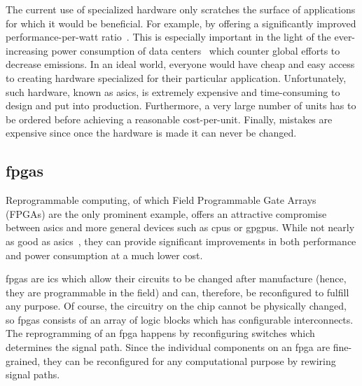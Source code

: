 The current use of specialized hardware only scratches the surface of
applications for which it would be beneficial. For example, by offering a
significantly improved performance-per-watt
ratio~\cite{fowers2012performance}. This is especially important in the light of
the ever-increasing power consumption of data centers~\cite{avgerinou2017trends}
which counter global efforts to decrease emissions. In an ideal world, everyone
would have cheap and easy access to creating hardware specialized for their
particular application. Unfortunately, such hardware, known as \glspl{asic}, is
extremely expensive and time-consuming to design and put into
production. Furthermore, a very large number of units has to be ordered before
achieving a reasonable cost-per-unit. Finally, mistakes are expensive since once
the hardware is made it can never be changed.




\subsection{\Glspl{fpga}}
Reprogrammable computing, of which Field Programmable Gate Arrays (FPGAs) are
the only prominent example, offers an attractive compromise between \glspl{asic} and
more general devices such as \glspl{cpu} or \glspl{gpgpu}. While not nearly as good as
\glspl{asic}~\cite{kuon2007measuring}, they can provide significant improvements in
both performance and power consumption at a much lower cost.

\glspl{fpga} are \glspl{ic} which allow their circuits to be changed after
manufacture (hence, they are programmable in the field) and can, therefore, be
reconfigured to fulfill any purpose. Of course, the circuitry on the chip cannot
be physically changed, so \glspl{fpga} consists of an array of logic blocks
which has configurable interconnects. The reprogramming of an \gls{fpga} happens
by reconfiguring switches which determines the signal path. Since the individual
components on an \gls{fpga} are fine-grained, they can be reconfigured for any
computational purpose by rewiring signal paths.

